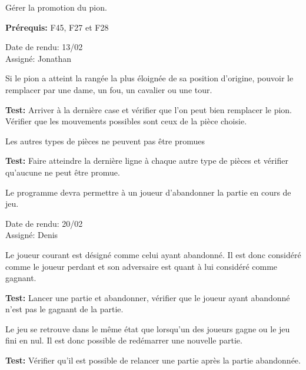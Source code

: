 \documentclass{article}
\begin{document}
\begin{needbox}
    Gérer la promotion du pion.

    \textbf{Prérequis:} F45, F27 et F28
    \begin{duedatebox}
        Date de rendu: 13/02\\
        Assigné: Jonathan
    \end{duedatebox}
    \begin{subneedbox}
        Si le pion a atteint la rangée la plus éloignée de sa position d'origine, pouvoir le remplacer par
        une dame, un fou, un cavalier ou une tour.

        \textbf{Test:} Arriver à la dernière case et vérifier que l'on peut bien remplacer le pion. 
        Vérifier que les mouvements possibles sont ceux de la pièce choisie.
    \end{subneedbox}
    \begin{subneedbox}
        Les autres types de pièces ne peuvent pas être promues

        \textbf{Test:} Faire atteindre la dernière ligne à chaque autre type de pièces
         et vérifier qu'aucune ne peut être promue.
    \end{subneedbox}
\end{needbox}

\begin{needbox}[F32: Abandon ]
    Le programme devra permettre à un joueur d'abandonner la partie en cours de jeu.
    \begin{duedatebox}
        Date de rendu: 20/02\\
        Assigné: Denis
    \end{duedatebox}
    \begin{subneedbox}[F32.1: Gagnant]
        Le joueur courant est désigné comme celui ayant abandonné.
        Il est donc considéré comme le joueur perdant et son adversaire
        est quant à lui considéré comme gagnant.

        \textbf{Test:} Lancer une partie et abandonner, vérifier que le joueur ayant
        abandonné n'est pas le gagnant de la partie.
    \end{subneedbox}
    \begin{subneedbox}
        Le jeu se retrouve dans le même état que lorsqu'un des joueurs
        gagne ou le jeu fini en nul. Il est donc possible de redémarrer
        une nouvelle partie.

        \textbf{Test:} Vérifier qu'il est possible de relancer une partie après
        la partie abandonnée.
    \end{subneedbox}
\end{needbox}
\end{document}
